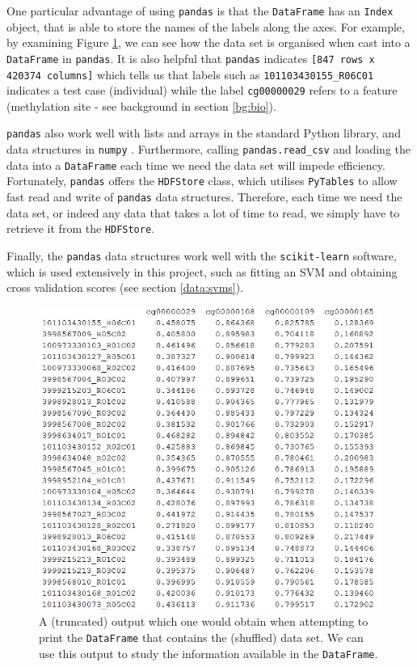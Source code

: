 \documentclass[12pt, twoside, a4paper]{report}
\begin{document}
One particular advantage of using \texttt{pandas} is that the \texttt{DataFrame} has an \texttt{Index} object, that is able to store the names of the labels along the axes. For example, by examining Figure \ref{data:pandas:example}, we can see how the data set is organised when cast into a \texttt{DataFrame} in \texttt{pandas}. It is also helpful that \texttt{pandas} indicates \texttt{[847 rows x 420374 columns]} which tells us that labels such as \texttt{101103430155\_R06C01} indicates a test case (individual) while the label \texttt{cg00000029} refers to a feature (methylation site - see background in section \ref{bg:bio}).

\texttt{pandas} also work well with lists and arrays in the standard Python library, and data structures in \texttt{numpy} \cite{RefWorks:214}. Furthermore, calling \texttt{pandas.read\_csv} and loading the data into a \texttt{DataFrame} each time we need the data set will impede efficiency. Fortunately, \texttt{pandas} offers the \texttt{HDFStore} class, which utilises \texttt{PyTables} \cite{pytables} to allow fast read and write of \texttt{pandas} data structures. Therefore, each time we need the data set, or indeed any data that takes a lot of time to read, we simply have to retrieve it from the \texttt{HDFStore}.

Finally, the \texttt{pandas} data structures work well with the \texttt{scikit-learn} software, which is used extensively in this project, such as fitting an SVM and obtaining cross validation scores (see section \ref{data:svms}).

\begin{figure}
\centering
\includegraphics[scale=0.9]{images/pandas-example.JPG}
\caption{A (truncated) output which one would obtain when attempting to print the \texttt{DataFrame} that contains the (shuffled) data set. We can use this output to study the information available in the \texttt{DataFrame}.}
\label{data:pandas:example}
\end{figure}
\end{document}
